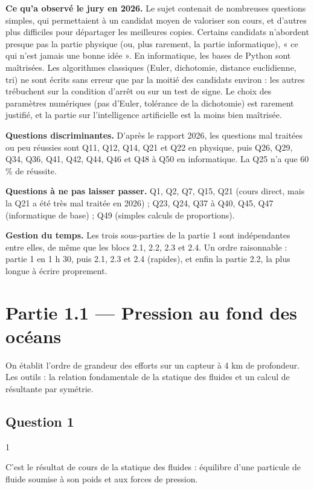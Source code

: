 \documentclass[11pt,a4paper]{article}
\begin{document}
\textbf{Ce qu'a observé le jury en 2026.} Le sujet contenait de nombreuses questions simples, qui permettaient à un candidat moyen de valoriser son cours, et d'autres plus difficiles pour départager les meilleures copies. Certains candidats n'abordent presque pas la partie physique (ou, plus rarement, la partie informatique), « ce qui n'est jamais une bonne idée ». En informatique, les bases de Python sont maîtrisées. Les algorithmes classiques (Euler, dichotomie, distance euclidienne, tri) ne sont écrits sans erreur que par la moitié des candidats environ : les autres trébuchent sur la condition d'arrêt ou sur un test de signe. Le choix des paramètres numériques (pas d'Euler, tolérance de la dichotomie) est rarement justifié, et la partie sur l'intelligence artificielle est la moins bien maîtrisée.

\textbf{Questions discriminantes.} D'après le rapport 2026, les questions mal traitées ou peu réussies sont Q11, Q12, Q14, Q21 et Q22 en physique, puis Q26, Q29, Q34, Q36, Q41, Q42, Q44, Q46 et Q48 à Q50 en informatique. La Q25 n'a que 60 \% de réussite.

\textbf{Questions à ne pas laisser passer.} Q1, Q2, Q7, Q15, Q21 (cours direct, mais la Q21 a été très mal traitée en 2026) ; Q23, Q24, Q37 à Q40, Q45, Q47 (informatique de base) ; Q49 (simples calculs de proportions).

\textbf{Gestion du temps.} Les trois sous-parties de la partie 1 sont indépendantes entre elles, de même que les blocs 2.1, 2.2, 2.3 et 2.4. Un ordre raisonnable : partie 1 en 1 h 30, puis 2.1, 2.3 et 2.4 (rapides), et enfin la partie 2.2, la plus longue à écrire proprement.

\hypertarget{partie-1.1-pression-au-fond-des-ocuxe9ans}{%
\section{Partie 1.1 --- Pression au fond des océans}\label{partie-1.1-pression-au-fond-des-ocuxe9ans}}

On établit l'ordre de grandeur des efforts sur un capteur à 4 km de profondeur. Les outils : la relation fondamentale de la statique des fluides et un calcul de résultante par symétrie.

\hypertarget{question-1}{%
\subsection{Question 1}\label{question-1}}

\begin{indication}{1}

C'est le résultat de cours de la statique des fluides : équilibre d'une particule de fluide soumise à son poids et aux forces de pression.

\end{indication}
\end{document}
